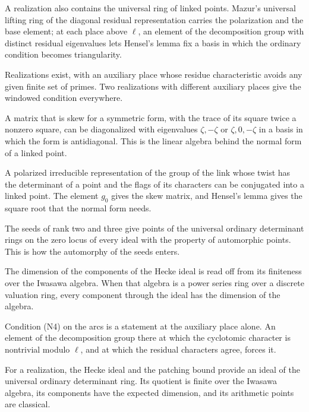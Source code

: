 A realization also contains the universal ring of linked points. Mazur's universal lifting ring of the diagonal residual representation carries the polarization and the base element; at each place above $\ell$, an element of the decomposition group with distinct residual eigenvalues lets Hensel's lemma fix a basis in which the ordinary condition becomes triangularity.

Realizations exist, with an auxiliary place whose residue characteristic avoids any given finite set of primes. Two realizations with different auxiliary places give the windowed condition everywhere.

A matrix that is skew for a symmetric form, with the trace of its square twice a nonzero square, can be diagonalized with eigenvalues $\zeta,-\zeta$ or $\zeta,0,-\zeta$ in a basis in which the form is antidiagonal. This is the linear algebra behind the normal form of a linked point.

A polarized irreducible representation of the group of the link whose twist has the determinant of a point and the flags of its characters can be conjugated into a linked point. The element $g_0$ gives the skew matrix, and Hensel's lemma gives the square root that the normal form needs.

The seeds of rank two and three give points of the universal ordinary determinant rings on the zero locus of every ideal with the property of automorphic points. This is how the automorphy of the seeds enters.

The dimension of the components of the Hecke ideal is read off from its finiteness over the Iwasawa algebra. When that algebra is a power series ring over a discrete valuation ring, every component through the ideal has the dimension of the algebra.

Condition (N4) on the arcs is a statement at the auxiliary place alone. An element of the decomposition group there at which the cyclotomic character is nontrivial modulo $\ell$, and at which the residual characters agree, forces it.

For a realization, the Hecke ideal and the patching bound provide an ideal of the universal ordinary determinant ring. Its quotient is finite over the Iwasawa algebra, its components have the expected dimension, and its arithmetic points are classical.

